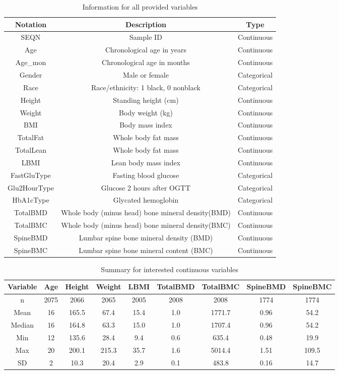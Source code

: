 \documentclass[11pt]{article}
\begin{document}
\begin{table}[ht]
\centering 
\caption{ Information for all provided variables\label{data3}}
\begin{tabular}{|c|c|c|}\hline
Notation& Description& Type\\\hline
SEQN& Sample ID& Continuous\\\hline
Age& Chronological age in years& Continuous\\\hline
Age\_mon& Chronological age in months& Continuous\\\hline
Gender& Male or female& Categorical\\\hline
Race& Race/ethnicity: 1 black, 0 nonblack& Categorical\\\hline
Height& Standing height (cm)& Continuous\\\hline
Weight&	Body weight (kg)&	Continuous\\\hline
BMI& Body mass index& Continuous\\\hline
TotalFat& Whole body fat mass& Continuous\\\hline
TotalLean& Whole body fat mass& Continuous\\\hline
LBMI& Lean body mass index& Continuous\\\hline
FastGluType& Fasting blood glucose& Categorical\\\hline
Glu2HourType& Glucose 2 hours after OGTT& Categorical\\\hline
HbA1cType& Glycated hemoglobin& Categorical\\\hline
TotalBMD& Whole body (minus head) bone mineral density(BMD)& Continuous\\\hline
TotalBMC& Whole body (minus head) bone mineral density(BMC)& Continuous\\\hline
SpineBMD& Lumbar spine bone mineral density (BMD)& Continuous\\\hline
SpineBMC& Lumbar spine bone mineral content (BMC)& Continuous\\\hline
\end{tabular}
\end{table}
			
\begin{center}
\begin{table}[ht]
\centering 
\caption{ Summary for interested continuous variables\label{data3}}
\begin{tabular}{|c|c|c|c|c|c|c|c|c|}\hline
Variable& Age& Height& Weight& LBMI& TotalBMD& TotalBMC& SpineBMD& SpineBMC\\\hline
n& 2075& 2066& 2065& 2005& 2008& 2008& 1774& 1774\\\hline
Mean& 16& 165.5& 67.4& 15.4& 1.0& 1771.7& 0.96& 54.2\\\hline
Median& 16& 164.8& 63.3& 15.0& 1.0 & 1707.4& 0.96& 54.2\\\hline
Min& 12& 135.6& 28.4& 9.4& 0.6& 635.4& 0.48& 19.9\\\hline
Max& 20& 200.1& 215.3& 35.7& 1.6& 5014.4& 1.51& 109.5\\\hline
SD& 2& 10.3& 20.4& 2.9& 0.1& 483.8& 0.16& 14.7\\\hline
\end{tabular}
\end{table}
\end{center}
\end{document}
